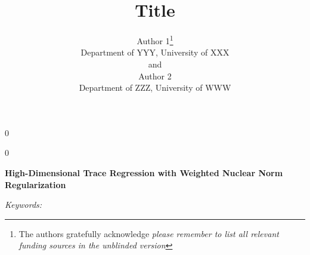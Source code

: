\documentclass[12pt]{article}
\newcommand{\blind}{0}
\begin{document}
\def\spacingset#1{\renewcommand{\baselinestretch}%
{#1}\small\normalsize} \spacingset{1}



\blind
{
  \title{\bf Title}
  \author{Author 1\thanks{
    The authors gratefully acknowledge \textit{please remember to list all relevant funding sources in the unblinded version}}\hspace{.2cm}\\
    Department of YYY, University of XXX\\
    and \\
    Author 2 \\
    Department of ZZZ, University of WWW}
  \maketitle
} \fi

\blind
{
  \bigskip
  \bigskip
  \bigskip
  \begin{center}
    {\Large\bf High-Dimensional Trace Regression with Weighted Nuclear Norm Regularization}
\end{center}
\begin{center}

	  \end{center}
	       \begin{center} 

\end{center}
  \medskip
} \fi

\bigskip
\begin{abstract}

\end{abstract}

\noindent%
{\it Keywords:  }   
\vfill

\spacingset{1.5} %
\end{document}
